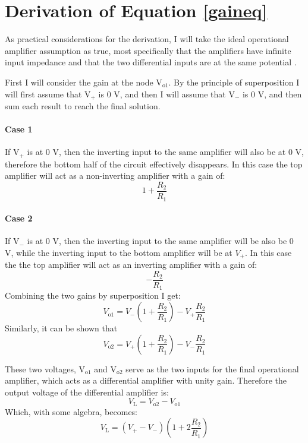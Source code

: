 \documentclass[justified,nobib]{tufte-handout}
\begin{document}
\section{Derivation of Equation \ref{gaineq}}
As practical considerations for the derivation, I will take the ideal
operational amplifier assumption as true, most specifically that the amplifiers
have infinite input impedance and that the two differential inputs are at the
same potential \cite{art}.

First I will consider the gain at the node V$_\textrm{o1}$. By the principle of
superposition I will first assume that V$_{+}$ is 0 V, and then I will assume
that V$_{-}$ is 0 V, and then sum each result to reach the final solution.

\paragraph{Case 1} If V$_{+}$ is at 0 V, then the inverting input to the same
amplifier will also be at 0 V, therefore the bottom half of the circuit
effectively disappears. In this case the top amplifier will act as
a non-inverting amplifier with a gain of:
\begin{equation}
1 + \frac{R_2}{R_1}
\end{equation}
\paragraph{Case 2} If V$_{-}$ is at 0 V, then the inverting input to the same
amplifier will be also be 0 V, while the inverting input to the bottom amplifier
will be at $V_{+}$. In this case the the top amplifier will act as an inverting
amplifier with a gain of:
\begin{equation}
-\frac{R_2}{R_1}
\end{equation}
Combining the two gains by superposition I get:
\begin{equation}
V_\textrm{o1}  = V_{-} \left(1 + \frac{R_2}{R_1}\right)
-V_{+} \frac{R_2}{R_1}
\end{equation}
Similarly, it can be shown that
\begin{equation}
V_\textrm{o2}  = V_{+} \left(1 + \frac{R_2}{R_1}\right)
-V_{-} \frac{R_2}{R_1}
\end{equation}

These two voltages, V$_\textrm{o1}$ and V$_\textrm{o2}$ serve as the two
inputs for the final operational amplifier, which acts as a differential
amplifier with unity gain. Therefore the output voltage of the differential
amplifier is:
\begin{equation}
V_{\mathrm{L}} = V_\textrm{o2} - V_\textrm{o1}  
\end{equation}
Which, with some algebra, becomes:
\begin{equation}
V_{\mathrm{L}} = (V_{+} - V_{-})\left(1 + 2\frac{R_2}{R_1}\right)
\end{equation}
\end{document}
